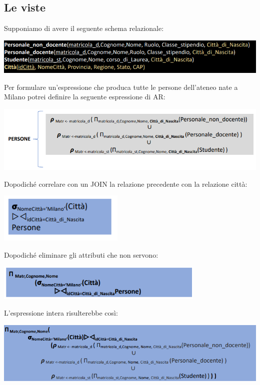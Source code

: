 \documentclass[12pt]{article}
\begin{document}
\subsection{Le viste}
Supponiamo di avere il seguente schema relazionale:
\begin{center}
    \includegraphics[width =1.10\textwidth]{Images/158.PNG}
\end{center}
Per formulare un'espressione che produca tutte le persone dell'ateneo nate a Milano potrei definire la seguente espressione di AR:
\begin{center}
    \includegraphics[width =1.15\textwidth]{Images/159.PNG}
\end{center}
Dopodiché correlare con un JOIN la relazione precedente con la relazione città:
\begin{center}
    \includegraphics[width =0.45\textwidth]{Images/160.PNG}
\end{center}
Dopodiché eliminare gli attributi che non servono:
\begin{center}
    \includegraphics[width =0.75\textwidth]{Images/161.PNG}
\end{center}
L'espressione intera risulterebbe così:
\begin{center}
    \includegraphics[width =1.15\textwidth]{Images/162.PNG}
\end{center}
\end{document}
